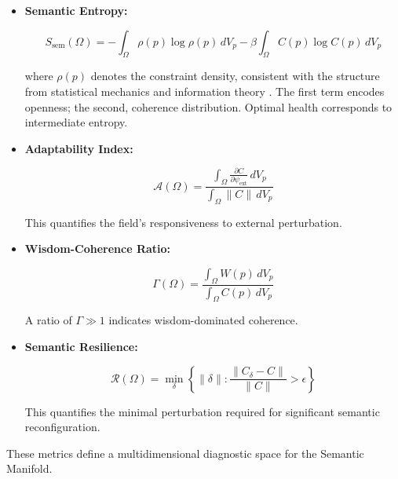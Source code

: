\begin{itemize}

    \item \textbf{Semantic Entropy:}

    \begin{equation}
    S_{\text{sem}}(\Omega) = -\int_{\Omega} \rho(p) \log\rho(p) \, dV_p - \beta \int_{\Omega} C(p) \log C(p) \, dV_p
    \end{equation}

where $\rho(p)$ denotes the constraint density, consistent with the structure from statistical mechanics and information theory \autocite{Shannon1948, CoverThomas2006, Reif1965, PathriaBeale2011}. The first term encodes openness; the second, coherence distribution. Optimal health corresponds to intermediate entropy.

    \item \textbf{Adaptability Index:}

    \begin{equation}
    \mathcal{A}(\Omega) = \frac{\int_{\Omega} \frac{\partial C}{\partial \psi_{\text{ext}}} \, dV_p}{\int_{\Omega} \|C\| \, dV_p}
    \end{equation}

    This quantifies the field's responsiveness to external perturbation.

    \item \textbf{Wisdom-Coherence Ratio:}

    \begin{equation}
    \Gamma(\Omega) = \frac{\int_{\Omega} W(p) \, dV_p}{\int_{\Omega} C(p) \, dV_p}
    \end{equation}

    A ratio of $\Gamma \gg 1$ indicates wisdom-dominated coherence.

    \item \textbf{Semantic Resilience:}

    \begin{equation}
    \mathcal{R}(\Omega) = \min_{\delta} \left\{\|\delta\| : \frac{\|C_{\delta} - C\|}{\|C\|} > \epsilon\right\}
    \end{equation}

    This quantifies the minimal perturbation required for significant semantic reconfiguration.

\end{itemize}

These metrics define a multidimensional diagnostic space for the Semantic Manifold.

